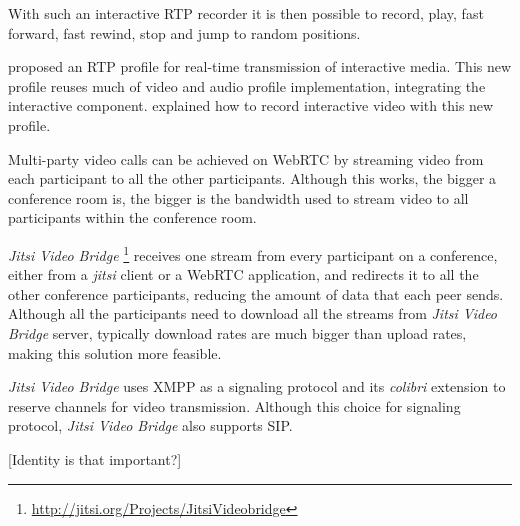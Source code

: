 	With such an interactive \ac{RTP} recorder it is then possible to record, play, fast forward, fast rewind, stop and jump to random positions.

  \cite{interactive_stream} proposed an \ac{RTP} profile for real-time transmission of interactive media. This new profile reuses much of video and audio profile implementation, integrating the interactive component.   \cite{interactive_record} explained how to record interactive video with this new profile.
	
	Multi-party video calls can be achieved on \ac{WebRTC} by streaming video from each participant to all the other participants. Although this works, the bigger a conference room is, the bigger is the bandwidth used to stream video to all participants within the conference room.

	\textit{Jitsi Video Bridge} \footnote{\url{http://jitsi.org/Projects/JitsiVideobridge}} receives one stream from every participant on a conference, either from a \textit{jitsi} client or a \ac{WebRTC} application, and redirects it to all the other conference participants, reducing the amount of data that each peer sends. Although all the participants need to download all the streams from \textit{Jitsi Video Bridge} server, typically download rates are much bigger than upload rates, making this solution more feasible.

	\textit{Jitsi Video Bridge} uses \ac{XMPP} as a signaling protocol and its \textit{colibri} extension \cite{xep0340} to reserve channels for video transmission. Although this choice for signaling protocol, \textit{Jitsi Video Bridge} also supports \ac{SIP}.

  {\color{fade}[Identity is that important?]}
